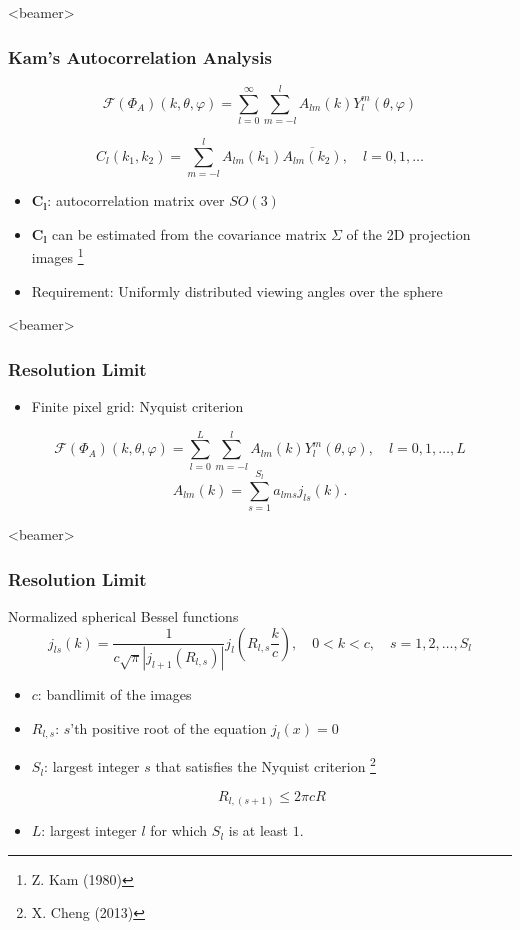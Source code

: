 \documentclass{beamer}
\newcommand\blfootnote[1]{%
  \begingroup
  \renewcommand\thefootnote{}\footnote{#1}%
  \addtocounter{footnote}{-1}%
  \endgroup
}
\newcommand{\bl}{\boldsymbol{l}}
\newcommand{\bC}{\boldsymbol{C}}
\def\bl{\boldsymbol{l}}
\begin{document}
\begin{frame}<beamer>
\frametitle{Kam's Autocorrelation Analysis}
\begin{equation}
\label{eq:phia_expansion_full}
\mathcal{F}(\Phi_A)(k,\theta,\varphi) = \sum_{l=0}^{\infty} \sum_{m=-l}^{l} 
A_{lm}(k)
Y_l^m
(\theta, \varphi) \nonumber
\end{equation}

\begin{equation}
\label{eq:Cl}
C_{{l}}(k_1,k_2) = \sum_{m=-l}^l A_{lm}(k_1)\overline{A_{lm}(k_2)}, \quad 
l=0,1,\ldots \nonumber
\end{equation}

\begin{itemize}
\item $\bC_{\bl}$: autocorrelation matrix over $SO(3)$
\item $\bC_{\bl}$ can be estimated from the covariance matrix $\Sigma$ of the 2D projection images \blfootnote{Z. Kam (1980)}
\item Requirement: Uniformly distributed viewing angles over the sphere
\end{itemize}
\end{frame}

\begin{frame}<beamer>
\frametitle{Resolution Limit}
\begin{itemize}
\item Finite pixel grid: Nyquist criterion
\end{itemize}
\begin{equation}\label{eq:phia_expansion}
\mathcal{F}(\Phi_A)(k,\theta,\varphi) = \sum_{l=0}^{L} \sum_{m=-l}^{l} A_{lm}(k)
Y_l^m
(\theta, \varphi), \quad l=0, 1,\ldots, L \nonumber
\end{equation}
\begin{equation}
\label{Alm_practice}
A_{lm}(k)= \sum_{s=1}^{S_l} a _{lms}j_{ls}(k).
\end{equation}
\end{frame}


\begin{frame}<beamer>
\frametitle{Resolution Limit}
Normalized spherical Bessel functions
\begin{equation}
\label{j_ls}
j_{ls}(k)= \frac{1}{c\sqrt{\pi}|j_{l+1}(R_{l,s})|} j_l(R_{l,s}\frac{k}{c}), \quad 0<k<c, 
\quad s=1,2,\ldots,S_l \nonumber
\end{equation}
\begin{itemize}
\item $c$: bandlimit of the images
\item $R_{l,s}$: $s$'th positive root of the equation $j_l(x)=0$
\item $S_l$: largest integer $s$ that satisfies the Nyquist criterion \blfootnote{X. Cheng (2013)}
\begin{equation}
\label{eq:nyq_sampling}
R_{l,(s+1)}\leq 2\pi cR \nonumber
\end{equation}
\item $L$: largest integer $l$ for which $S_l$ is at least $1$.
\end{itemize}
\end{frame}
\end{document}
